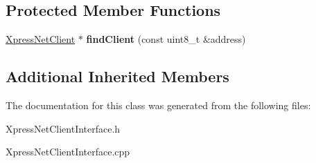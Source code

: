 \subsection*{Protected Member Functions}
\begin{DoxyCompactItemize}
\item 
\mbox{\label{classTBT_1_1XpressNetClientInterface_ac7c05010e7a1cb8fe251c0154ca421d3}} 
\hyperlink{classTBT_1_1XpressNetClient}{Xpress\+Net\+Client} $\ast$ {\bfseries find\+Client} (const uint8\+\_\+t \&address)
\end{DoxyCompactItemize}
\subsection*{Additional Inherited Members}


The documentation for this class was generated from the following files\+:\begin{DoxyCompactItemize}
\item 
Xpress\+Net\+Client\+Interface.\+h\item 
Xpress\+Net\+Client\+Interface.\+cpp\end{DoxyCompactItemize}
